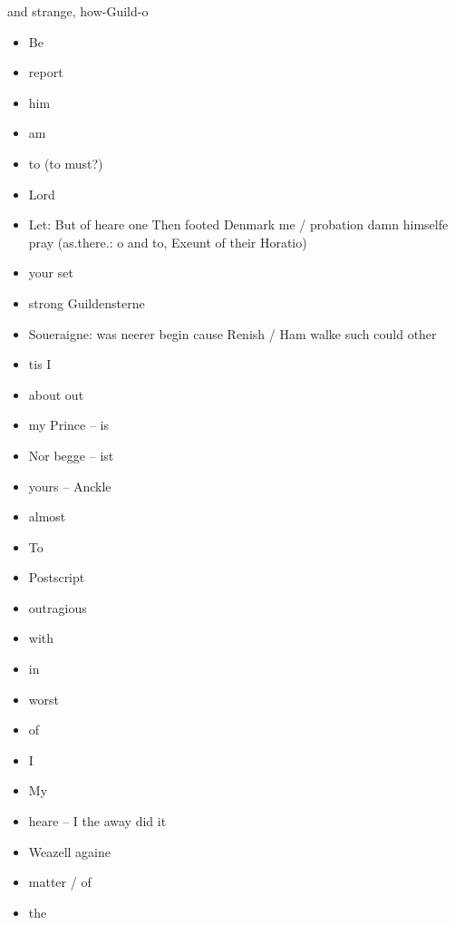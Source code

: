 \begin{leaue}



and strange, how-Guild-o


\begin{itemize}
  \item Be 
  \item report 
  \item him
  \item am
  \item to (to must?)
  \item Lord
  \item Let:
      But of heare one Then footed Denmark me / probation damn himselfe pray
      (as.there.: o and to, Exeunt of their Horatio)
  \item your set
  \item strong Guildensterne
  \item Soueraigne: was neerer begin cause Renish / Ham walke such could other
  \item tis I
  \item about out
  \item my Prince -- is
  \item Nor begge -- ist
  \item yours -- Anckle
  \item almost
  \item To
  \item Postscript
  \item outragious
  \item with
  \item in
  \item worst
  \item of
  \item I
  \item My
  \item heare -- I the away did it
  \item Weazell againe 
  \item matter / of
  \item the
\end{itemize}



\end{leaue}

